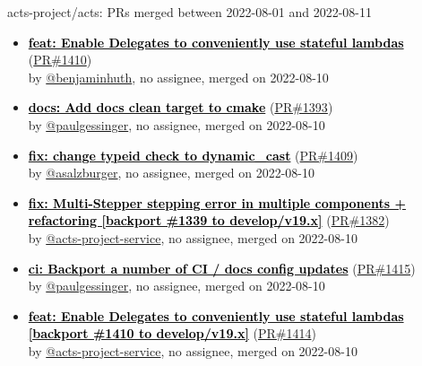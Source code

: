 \begin{frame}[allowframebreaks]{ acts-project/acts: PRs merged 
between 2022-08-01 and 2022-08-11
}
\begin{itemize}
    \item
    \prmerged\textbf{\href{https://github.com/acts-project/acts/pull/1410}{\textcolor{black}{feat: Enable Delegates to conveniently use stateful lambdas}}}
    (\href{https://github.com/acts-project/acts/pull/1410}{PR\#1410}) \\
    by \href{https://github.com/benjaminhuth}{@benjaminhuth}, {}no assignee, merged on 2022-08-10

    \item
    \prmerged\textbf{\href{https://github.com/acts-project/acts/pull/1393}{\textcolor{black}{docs: Add docs clean target to cmake}}}
    (\href{https://github.com/acts-project/acts/pull/1393}{PR\#1393}) \\
    by \href{https://github.com/paulgessinger}{@paulgessinger}, {}no assignee, merged on 2022-08-10

    \item
    \prmerged\textbf{\href{https://github.com/acts-project/acts/pull/1409}{\textcolor{black}{fix: change typeid check to dynamic\_cast}}}
    (\href{https://github.com/acts-project/acts/pull/1409}{PR\#1409}) \\
    by \href{https://github.com/asalzburger}{@asalzburger}, {}no assignee, merged on 2022-08-10

    \item
    \prmerged\textbf{\href{https://github.com/acts-project/acts/pull/1382}{\textcolor{black}{fix: Multi-Stepper stepping error in multiple components + refactoring [backport \#1339 to develop/v19.x]}}}
    (\href{https://github.com/acts-project/acts/pull/1382}{PR\#1382}) \\
    by \href{https://github.com/acts-project-service}{@acts-project-service}, {}no assignee, merged on 2022-08-10

    \item
    \prmerged\textbf{\href{https://github.com/acts-project/acts/pull/1415}{\textcolor{black}{ci: Backport a number of CI / docs config updates}}}
    (\href{https://github.com/acts-project/acts/pull/1415}{PR\#1415}) \\
    by \href{https://github.com/paulgessinger}{@paulgessinger}, {}no assignee, merged on 2022-08-10

    \item
    \prmerged\textbf{\href{https://github.com/acts-project/acts/pull/1414}{\textcolor{black}{feat: Enable Delegates to conveniently use stateful lambdas [backport \#1410 to develop/v19.x]}}}
    (\href{https://github.com/acts-project/acts/pull/1414}{PR\#1414}) \\
    by \href{https://github.com/acts-project-service}{@acts-project-service}, {}no assignee, merged on 2022-08-10


\end{itemize}
\end{frame}
